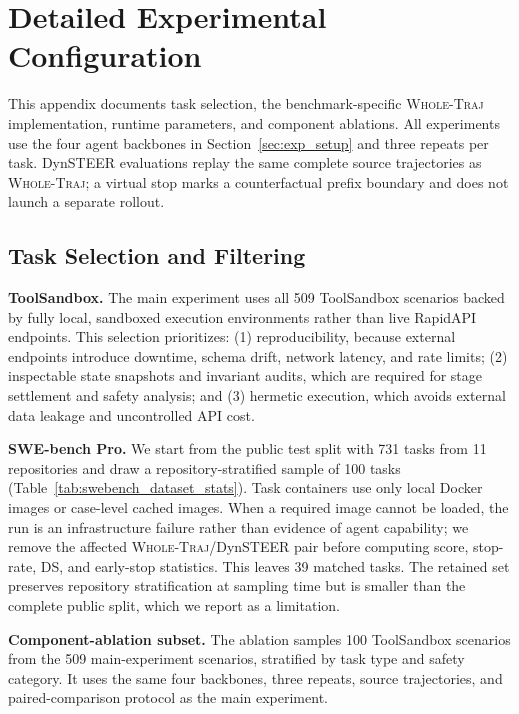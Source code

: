 \section{Detailed Experimental Configuration}
\label{app:experiment_config}

This appendix documents task selection, the benchmark-specific \textsc{Whole-Traj} implementation, runtime parameters, and component ablations. All experiments use the four agent backbones in Section~\ref{sec:exp_setup} and three repeats per task. DynSTEER evaluations replay the same complete source trajectories as \textsc{Whole-Traj}; a virtual stop marks a counterfactual prefix boundary and does not launch a separate rollout.

\subsection{Task Selection and Filtering}
\label{app:task_selection}

\textbf{ToolSandbox.} The main experiment uses all 509 ToolSandbox scenarios backed by fully local, sandboxed execution environments rather than live RapidAPI endpoints. This selection prioritizes: (1) reproducibility, because external endpoints introduce downtime, schema drift, network latency, and rate limits; (2) inspectable state snapshots and invariant audits, which are required for stage settlement and safety analysis; and (3) hermetic execution, which avoids external data leakage and uncontrolled API cost.

\textbf{SWE-bench Pro.} We start from the public test split with 731 tasks from 11 repositories and draw a repository-stratified sample of 100 tasks (Table~\ref{tab:swebench_dataset_stats}). Task containers use only local Docker images or case-level cached images. When a required image cannot be loaded, the run is an infrastructure failure rather than evidence of agent capability; we remove the affected \textsc{Whole-Traj}/DynSTEER pair before computing score, stop-rate, DS, and early-stop statistics. This leaves 39 matched tasks. The retained set preserves repository stratification at sampling time but is smaller than the complete public split, which we report as a limitation.

\textbf{Component-ablation subset.} The ablation samples 100 ToolSandbox scenarios from the 509 main-experiment scenarios, stratified by task type and safety category. It uses the same four backbones, three repeats, source trajectories, and paired-comparison protocol as the main experiment.

